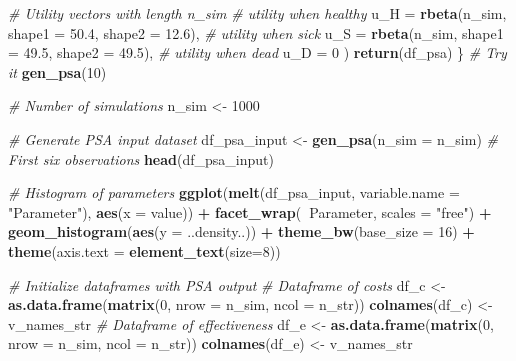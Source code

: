 \documentclass[
]{article}
\newenvironment{Shaded}{\begin{snugshade}}{\end{snugshade}}
\newcommand{\CommentTok}[1]{\textcolor[rgb]{0.56,0.35,0.01}{\textit{#1}}}
\newcommand{\DataTypeTok}[1]{\textcolor[rgb]{0.13,0.29,0.53}{#1}}
\newcommand{\DecValTok}[1]{\textcolor[rgb]{0.00,0.00,0.81}{#1}}
\newcommand{\FloatTok}[1]{\textcolor[rgb]{0.00,0.00,0.81}{#1}}
\newcommand{\KeywordTok}[1]{\textcolor[rgb]{0.13,0.29,0.53}{\textbf{#1}}}
\newcommand{\NormalTok}[1]{#1}
\newcommand{\OperatorTok}[1]{\textcolor[rgb]{0.81,0.36,0.00}{\textbf{#1}}}
\newcommand{\StringTok}[1]{\textcolor[rgb]{0.31,0.60,0.02}{#1}}
\begin{document}
\begin{Shaded}
\begin{Highlighting}[]
    \CommentTok{# Utility vectors with length n_sim }
    \CommentTok{# utility when healthy}
    \DataTypeTok{u_H      =} \KeywordTok{rbeta}\NormalTok{(n_sim, }\DataTypeTok{shape1 =}  \FloatTok{50.4}\NormalTok{, }\DataTypeTok{shape2 =} \FloatTok{12.6}\NormalTok{), }
    \CommentTok{# utility when sick}
    \DataTypeTok{u_S      =} \KeywordTok{rbeta}\NormalTok{(n_sim, }\DataTypeTok{shape1 =} \FloatTok{49.5}\NormalTok{, }\DataTypeTok{shape2 =} \FloatTok{49.5}\NormalTok{), }
    \CommentTok{# utility when dead}
    \DataTypeTok{u_D      =} \DecValTok{0}                                              
\NormalTok{  )}
  \KeywordTok{return}\NormalTok{(df_psa)}
\NormalTok{\}}
\CommentTok{# Try it}
\KeywordTok{gen_psa}\NormalTok{(}\DecValTok{10}\NormalTok{) }

\CommentTok{# Number of simulations}
\NormalTok{n_sim <-}\StringTok{ }\DecValTok{1000}

\CommentTok{# Generate PSA input dataset}
\NormalTok{df_psa_input <-}\StringTok{ }\KeywordTok{gen_psa}\NormalTok{(}\DataTypeTok{n_sim =}\NormalTok{ n_sim)}
\CommentTok{# First six observations}
\KeywordTok{head}\NormalTok{(df_psa_input)}

\CommentTok{# Histogram of parameters}
\KeywordTok{ggplot}\NormalTok{(}\KeywordTok{melt}\NormalTok{(df_psa_input, }\DataTypeTok{variable.name =} \StringTok{"Parameter"}\NormalTok{), }\KeywordTok{aes}\NormalTok{(}\DataTypeTok{x =}\NormalTok{ value)) }\OperatorTok{+}
\StringTok{       }\KeywordTok{facet_wrap}\NormalTok{(}\OperatorTok{~}\NormalTok{Parameter, }\DataTypeTok{scales =} \StringTok{"free"}\NormalTok{) }\OperatorTok{+}
\StringTok{       }\KeywordTok{geom_histogram}\NormalTok{(}\KeywordTok{aes}\NormalTok{(}\DataTypeTok{y =}\NormalTok{ ..density..)) }\OperatorTok{+}
\StringTok{       }\KeywordTok{theme_bw}\NormalTok{(}\DataTypeTok{base_size =} \DecValTok{16}\NormalTok{) }\OperatorTok{+}\StringTok{ }
\StringTok{       }\KeywordTok{theme}\NormalTok{(}\DataTypeTok{axis.text =} \KeywordTok{element_text}\NormalTok{(}\DataTypeTok{size=}\DecValTok{8}\NormalTok{))}

\CommentTok{# Initialize dataframes with PSA output }
\CommentTok{# Dataframe of costs}
\NormalTok{df_c <-}\StringTok{ }\KeywordTok{as.data.frame}\NormalTok{(}\KeywordTok{matrix}\NormalTok{(}\DecValTok{0}\NormalTok{, }
                      \DataTypeTok{nrow =}\NormalTok{ n_sim,}
                      \DataTypeTok{ncol =}\NormalTok{ n_str))}
\KeywordTok{colnames}\NormalTok{(df_c) <-}\StringTok{ }\NormalTok{v_names_str}
\CommentTok{# Dataframe of effectiveness}
\NormalTok{df_e <-}\StringTok{ }\KeywordTok{as.data.frame}\NormalTok{(}\KeywordTok{matrix}\NormalTok{(}\DecValTok{0}\NormalTok{, }
                      \DataTypeTok{nrow =}\NormalTok{ n_sim,}
                      \DataTypeTok{ncol =}\NormalTok{ n_str))}
\KeywordTok{colnames}\NormalTok{(df_e) <-}\StringTok{ }\NormalTok{v_names_str}
\end{Highlighting}
\end{Shaded}
\end{document}
